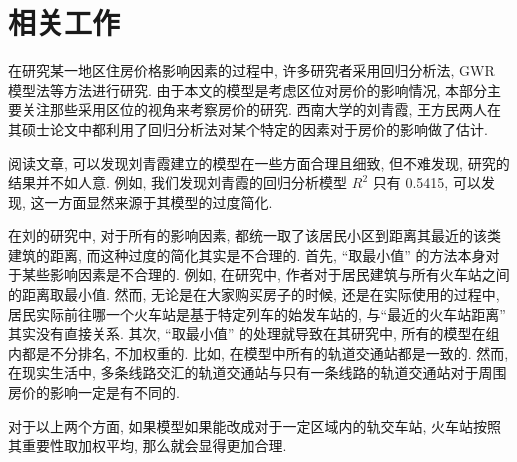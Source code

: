 \section{相关工作}
在研究某一地区住房价格影响因素的过程中, 许多研究者采用回归分析法, GWR 模型法等方法进行研究.
由于本文的模型是考虑区位对房价的影响情况, 本部分主要关注那些采用区位的视角来考察房价的研究.
西南大学的刘青霞, 王方民两人在其硕士论文中都利用了回归分析法对某个特定的因素对于房价的影响做了估计. \cite{RN4,RN5}

阅读文章, 可以发现刘青霞建立的模型在一些方面合理且细致, 但不难发现, 研究的结果并不如人意.
例如, 我们发现刘青霞的回归分析模型 $R^2$ 只有 \num{0.5415}, 可以发现, 这一方面显然来源于其模型的过度简化.

在刘的研究中, 对于所有的影响因素, 都统一取了该居民小区到距离其最近的该类建筑的距离, 而这种过度的简化其实是不合理的.
首先, ``取最小值'' 的方法本身对于某些影响因素是不合理的.
例如, 在研究中, 作者对于居民建筑与所有火车站之间的距离取最小值.
然而, 无论是在大家购买房子的时候, 还是在实际使用的过程中, 居民实际前往哪一个火车站是基于特定列车的始发车站的, 与``最近的火车站距离'' 其实没有直接关系.
其次, ``取最小值'' 的处理就导致在其研究中, 所有的模型在组内都是不分排名, 不加权重的.
比如, 在模型中所有的轨道交通站都是一致的.
然而, 在现实生活中, 多条线路交汇的轨道交通站与只有一条线路的轨道交通站对于周围房价的影响一定是有不同的.

对于以上两个方面, 如果模型如果能改成对于一定区域内的轨交车站, 火车站按照其重要性取加权平均, 那么就会显得更加合理.
